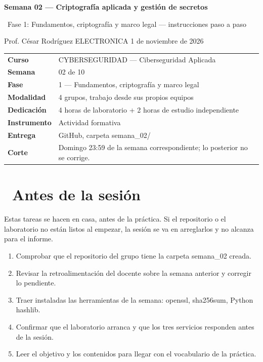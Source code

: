 \documentclass[11pt,a4paper]{article}
\newcommand{\iconoBanda}{microchip}
\newcommand{\bandaTitulo}[3][fondoOscuro]{%
  \begin{tcolorbox}[
    enhanced,
    colback=#1, colframe=#1,
    boxrule=0pt, arc=8pt, outer arc=8pt,
    width=\linewidth,
    top=18pt, bottom=6pt, left=14pt, right=14pt,
    borderline south={3.5pt}{0pt}{cyanNeon},
  ]
    \begin{minipage}[c]{0.07\linewidth}
      \centering
      \textcolor{cyanNeon}{\fontsize{30}{30}\selectfont\faIcon{\iconoBanda}}
    \end{minipage}%
    \hspace{8pt}%
    \begin{minipage}[c]{0.88\linewidth}
      {\fontsize{20}{24}\selectfont\bfseries\color{white}#2}\par\vspace{5pt}%
      \textcolor{cyanNeon!80!white}{\small\faIcon{angle-right}~#3}%
    \end{minipage}
    \vspace{4pt}
  \end{tcolorbox}%
  \vspace{8pt}%
}
\newcommand{\iconotexto}[2]{\textcolor{cyanNeon}{\faIcon{#1}}~#2}
\renewcommand{\iconoBanda}{shield-alt}
\begin{document}
\bandaTitulo[fondoOscuro]{Semana 02 --- Criptografía aplicada y gestión de secretos}{Fase 1: Fundamentos, criptografía y marco legal --- instrucciones paso a paso}

\begin{center}\small\color{grisTexto}Prof. César Rodríguez \textbar{} ELECTRONICA \textbar{} 1 de noviembre de 2026\end{center}

\begin{tabularx}{\linewidth}{@{}>{\raggedright\arraybackslash}p{4.6cm}X@{}}
\toprule
\textbf{Curso} & CYBERSEGURIDAD --- Ciberseguridad Aplicada \\
\textbf{Semana} & 02 de 10 \\
\textbf{Fase} & 1 --- Fundamentos, criptografía y marco legal \\
\textbf{Modalidad} & 4 grupos, trabajo desde sus propios equipos \\
\textbf{Dedicación} & 4 horas de laboratorio + 2 horas de estudio independiente \\
\textbf{Instrumento} & Actividad formativa \\
\textbf{Entrega} & GitHub, carpeta semana\_02/ \\
\textbf{Corte} & Domingo 23:59 de la semana correspondiente; lo posterior no se corrige. \\
\bottomrule
\end{tabularx}

\section{\iconotexto{clock}{Antes de la sesión}}

Estas tareas se hacen en casa, antes de la práctica. Si el repositorio o el laboratorio no están listos al empezar, la sesión se va en arreglarlos y no alcanza para el informe.

\begin{enumerate}[leftmargin=1.4em,itemsep=2pt,topsep=3pt]
  \item Comprobar que el repositorio del grupo tiene la carpeta semana\_02 creada.
  \item Revisar la retroalimentación del docente sobre la semana anterior y corregir lo pendiente.
  \item Traer instaladas las herramientas de la semana: openssl, sha256sum, Python hashlib.
  \item Confirmar que el laboratorio arranca y que los tres servicios responden antes de la sesión.
  \item Leer el objetivo y los contenidos para llegar con el vocabulario de la práctica.
\end{enumerate}
\end{document}
